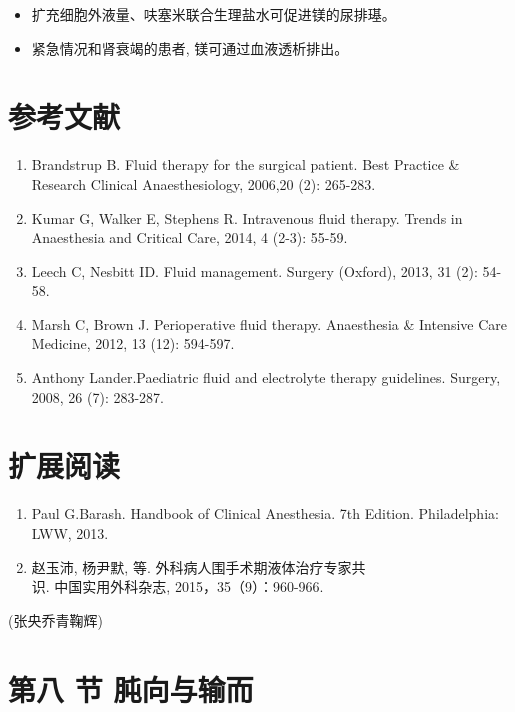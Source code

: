 \documentclass[10pt]{article}
\begin{document}
\begin{itemize}
  \item 扩充细胞外液量、呋塞米联合生理盐水可促进镁的尿排璂。
  \item 紧急情况和肾衰竭的患者, 镁可通过血液透析排出。
\end{itemize}

\section*{参考文献}
\begin{enumerate}
  \item Brandstrup B. Fluid therapy for the surgical patient. Best Practice \& Research Clinical Anaesthesiology, 2006,20 (2): 265-283.

  \item Kumar G, Walker E, Stephens R. Intravenous fluid therapy. Trends in Anaesthesia and Critical Care, 2014, 4 (2-3): 55-59.

  \item Leech C, Nesbitt ID. Fluid management. Surgery (Oxford), 2013, 31 (2): 54-58.

  \item Marsh C, Brown J. Perioperative fluid therapy. Anaesthesia \& Intensive Care Medicine, 2012, 13 (12): 594-597.

  \item Anthony Lander.Paediatric fluid and electrolyte therapy guidelines. Surgery, 2008, 26 (7): 283-287.

\end{enumerate}

\section*{扩展阅读}
\begin{enumerate}
  \item Paul G.Barash. Handbook of Clinical Anesthesia. 7th Edition. Philadelphia: LWW, 2013.

  \item 赵玉沛, 杨尹默, 等. 外科病人围手术期液体治疗专家共\\
识. 中国实用外科杂志, 2015，35（9）：960-966.

\end{enumerate}

(张央乔青鞠辉)

\section*{第八 节 肫向与输而}
\end{document}
